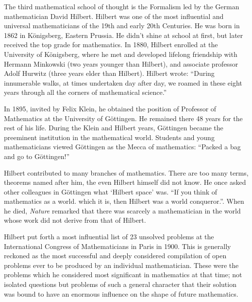 \documentclass{article}
\begin{document}
The third mathematical school of thought is the Formalism led by the German mathematician David Hilbert. Hilbert was one of the most influential and universal mathematicians of the 19th and early 20th Centuries. He was born in 1862 in Königsberg, Eastern Prussia. He didn't shine at school at first, but later received the top grade for mathematics. In 1880, Hilbert enrolled at the University of Königsberg, where he met and developed lifelong friendship with Hermann Minkowski (two years younger than Hilbert), and associate professor Adolf Hurwitz (three years elder than Hilbert). Hilbert wrote: ``During innumerable walks, at times undertaken day after day, we roamed in these eight years through all the corners of mathematical science.''

In 1895, invited by Felix Klein, he obtained the position of Professor of Mathematics at the University of Göttingen. He remained there 48 years for the rest of his life. During the Klein and Hilbert years, Göttingen became the preeminent institution in the mathematical world. Students and young mathematicians viewed Göttingen as the Mecca of mathematics: ``Packed a bag and go to Göttingen!''

Hilbert contributed to many branches of mathematics. There are too many terms, theorems named after him, the even Hilbert himself did not know. He once asked other colleagues in Göttingen what `Hilbert space' was. ``If you think of mathematics as a world. which it is, then Hilbert was a world conqueror.''. When he died, {\em Nature} remarked that there was scarcely a mathematician in the world whose work did not derive from that of Hilbert.\cite{Ried-1996}

Hilbert put forth a most influential list of 23 unsolved problems at the International Congress of Mathematicians in Paris in 1900. This is generally reckoned as the most successful and deeply considered compilation of open problems ever to be produced by an individual mathematician. These were the problems which he considered most significant in mathematics at that time; not isolated questions but problems of such a general character that their solution was bound to have an enormous influence on the shape of future mathematics.
\end{document}
